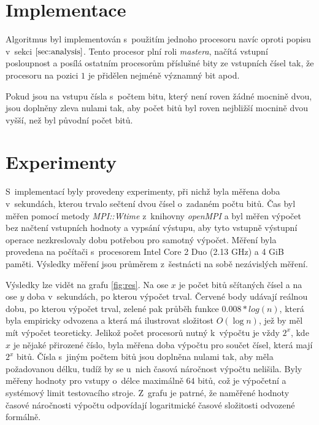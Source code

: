 \documentclass[a4paper, 12pt]{article}
\begin{document}
\section{Implementace}
\label{sec:impl}
Algoritmus byl implementován s~použitím jednoho procesoru navíc oproti popisu v~sekci $\ref{sec:analysis}$.
Tento procesor plní roli \emph{mastera}, načítá vstupní posloupnost a posílá ostatním procesorům příslušné bity
ze vstupních čísel tak, že procesoru na pozici $1$ je přidělen nejméně významný bit apod.

Pokud jsou na vstupu čísla s~počtem bitu, který není roven žádné mocnině dvou, jsou doplněny zleva nulami tak,
aby počet bitů byl roven nejbližší mocnině dvou vyšší, než byl původní počet bitů.

\section{Experimenty}
\label{sec:exprmts}
S~implementací byly provedeny experimenty, při nichž byla měřena doba v~sekundách, kterou
trvalo sečtení dvou čísel o~zadaném počtu bitů.
Čas byl měřen pomocí metody \emph{MPI::Wtime} z~knihovny \emph{openMPI}
a byl měřen výpočet bez načtení vstupních hodnoty a vypsání výstupu,
aby tyto vstupně výstupní operace nezkreslovaly dobu potřebou pro samotný výpočet.
Měření byla provedena na počítači s~procesorem Intel Core 2 Duo (2.13 GHz) a 4 GiB paměti.
Výsledky měření jsou průměrem z~šestnácti na sobě nezávislých měření.

Výsledky lze vidět na grafu \ref{fig:res}.
Na ose $x$ je počet bitů sčítaných čísel a na ose $y$ doba v~sekundách,
po kterou výpočet trval.
Červené body udávají reálnou dobu, po kterou výpočet trval, zelené
pak průběh funkce $0.008*log(n)$, která byla empiricky odvozena
a která má ilustrovat složitost $O(\log{n})$, jež by měl mít výpočet teoreticky.
Jelikož počet procesorů nutný k~výpočtu je vždy $2^x$, kde $x$ je nějaké přirozené číslo,
byla měřena doba výpočtu pro součet čísel, která mají $2^x$ bitů.
Čísla s~jiným počtem bitů jsou doplněna nulami tak, aby měla požadovanou délku, tudíž
by se u~nich časová náročnost výpočtu nelišila.
Byly měřeny hodnoty pro vstupy o~délce maximálně $64$ bitů, což je výpočetní a systémový limit testovacího
stroje.
Z~grafu je patrné, že naměřené hodnoty časové náročnosti výpočtu odpovídají logaritmické
časové složitosti odvozené formálně.
\end{document}
